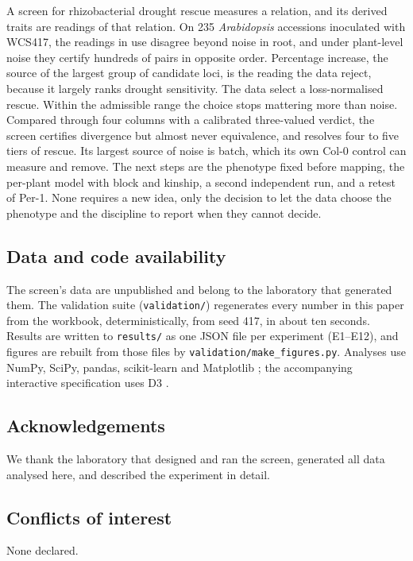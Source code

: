 \documentclass[10pt,twocolumn,a4paper]{article}
\theoremstyle{definition}
\theoremstyle{remark}
\begin{document}
A screen for rhizobacterial drought rescue measures a relation, and its
derived traits are readings of that relation. On 235 \emph{Arabidopsis}
accessions inoculated with WCS417, the readings in use disagree beyond
noise in root, and under plant-level noise they certify hundreds of pairs
in opposite order. Percentage increase, the source of the largest group
of candidate loci, is the reading the data reject, because it largely
ranks drought sensitivity. The data select a loss-normalised rescue.
Within the admissible range the choice stops mattering more than noise.
Compared through four columns with a calibrated three-valued verdict, the
screen certifies divergence but almost never equivalence, and resolves
four to five tiers of rescue. Its largest source of noise is batch, which
its own Col-0 control can measure and remove. The next steps are the
phenotype fixed before mapping, the per-plant model with block and
kinship, a second independent run, and a retest of Per-1. None requires
a new idea, only the decision to let the data choose the phenotype and
the discipline to report when they cannot decide.

\subsection*{Data and code availability}
The screen's data are unpublished and belong to the laboratory that
generated them. The validation suite (\texttt{validation/}) regenerates
every number in this paper from the workbook, deterministically, from
seed 417, in about ten seconds. Results are written to \texttt{results/}
as one JSON file per experiment (E1--E12), and figures are rebuilt from
those files by \texttt{validation/make\_figures.py}. Analyses use NumPy,
SciPy, pandas, scikit-learn and Matplotlib
\citep{harris2020,virtanen2020,mckinney2010,pedregosa2011,hunter2007};
the accompanying interactive specification uses D3 \citep{bostock2011}.

\subsection*{Acknowledgements}
We thank the laboratory that designed and ran the screen, generated all
data analysed here, and described the experiment in detail.

\subsection*{Conflicts of interest}
None declared.


\end{document}
